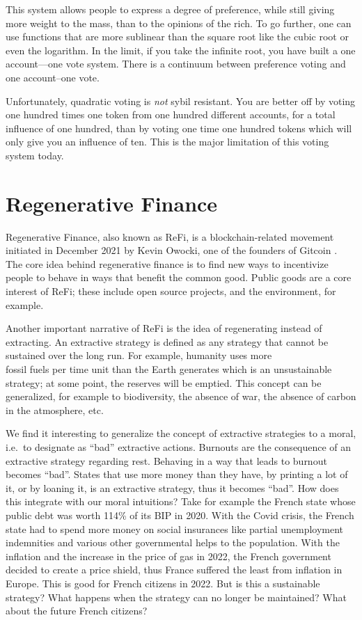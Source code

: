 This system allows people to express a degree of preference, while still giving more weight to the mass, than to the opinions of the rich.
To go further, one can use functions that are more sublinear than the square root like the cubic root or even the logarithm.
In the limit, if you take the infinite root, you have built a one account––one vote system.
There is a continuum between preference voting and one account--one vote.

Unfortunately, quadratic voting is \emph{not} sybil resistant.
You are better off by voting one hundred times one token from one hundred different accounts, for a total influence of one hundred, than by voting one time one hundred tokens which will only give you an influence of ten.
This is the major limitation of this voting system today.

\section{Regenerative Finance}

Regenerative Finance, also known as ReFi, is a blockchain-related movement initiated in December 2021 by Kevin Owocki, one of the founders of Gitcoin%
.
The core idea behind regenerative finance is to find new ways to incentivize people to behave in ways that benefit the common good.
Public goods are a core interest of ReFi; these include open source projects, and the environment, for example.

Another important narrative of ReFi is the idea of regenerating instead of extracting.
An extractive strategy is defined as any strategy that cannot be sustained over the long run.
For example, humanity uses more\\fossil fuels per time unit than the Earth generates which is an unsustainable strategy; at some point, the reserves will be emptied.
This concept can be generalized, for example to biodiversity, the absence of war, the absence of carbon in the atmosphere, etc.

We find it interesting to generalize the concept of extractive strategies to a moral, i.e.\ to designate as \enquote{bad} extractive actions.
Burnouts are the consequence of an extractive strategy regarding rest.
Behaving in a way that leads to burnout becomes \enquote{bad}.
States that use more money than they have, by printing a lot of it, or by loaning it, is an extractive strategy, thus it becomes \enquote{bad}.
How does this integrate with our moral intuitions?
Take for example the French state whose public debt was worth 114\% of its BIP in 2020.
With the Covid crisis, the French state had to spend more money on social insurances like partial unemployment indemnities and various other governmental helps to the population.
With the inflation and the increase in the price of gas in 2022, the French government decided to create a price shield, thus France suffered the least from inflation in Europe.
This is good for French citizens in 2022.
But is this a sustainable strategy?
What happens when the strategy can no longer be maintained?
What about the future French citizens?

